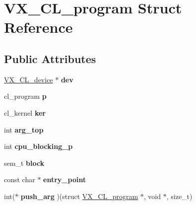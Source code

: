 \hypertarget{structVX__CL__program}{\section{V\-X\-\_\-\-C\-L\-\_\-program Struct Reference}
\label{structVX__CL__program}
}
\subsection*{Public Attributes}
\begin{DoxyCompactItemize}
\item 
\hypertarget{structVX__CL__program_aba4a5c73281e2969f0a7b1c2f6b8abfd}{\hyperlink{structVX__CL__device}{V\-X\-\_\-\-C\-L\-\_\-device} $\ast$ {\bfseries dev}}\label{structVX__CL__program_aba4a5c73281e2969f0a7b1c2f6b8abfd}

\item 
\hypertarget{structVX__CL__program_af38a41457c59d627e8683bd45feb2e28}{cl\-\_\-program {\bfseries p}}\label{structVX__CL__program_af38a41457c59d627e8683bd45feb2e28}

\item 
\hypertarget{structVX__CL__program_abc72bc4d0b075ccc52b6c076db0f8dbe}{cl\-\_\-kernel {\bfseries ker}}\label{structVX__CL__program_abc72bc4d0b075ccc52b6c076db0f8dbe}

\item 
\hypertarget{structVX__CL__program_a9ee13ce6d07263f718148f33e2ea556e}{int {\bfseries arg\-\_\-top}}\label{structVX__CL__program_a9ee13ce6d07263f718148f33e2ea556e}

\item 
\hypertarget{structVX__CL__program_aa509a6a6d02efddac17298b78d576eaf}{int {\bfseries cpu\-\_\-blocking\-\_\-p}}\label{structVX__CL__program_aa509a6a6d02efddac17298b78d576eaf}

\item 
\hypertarget{structVX__CL__program_a572c7479c16d01842e6d4a57fcfc47fd}{sem\-\_\-t {\bfseries block}}\label{structVX__CL__program_a572c7479c16d01842e6d4a57fcfc47fd}

\item 
\hypertarget{structVX__CL__program_a72bfa0908a58f68b280b92d3157c7f9c}{const char $\ast$ {\bfseries entry\-\_\-point}}\label{structVX__CL__program_a72bfa0908a58f68b280b92d3157c7f9c}

\item 
\hypertarget{structVX__CL__program_a2059650e208a8954d569d9a6f5a1a6e8}{int($\ast$ {\bfseries push\-\_\-arg} )(struct \hyperlink{structVX__CL__program}{V\-X\-\_\-\-C\-L\-\_\-program} $\ast$, void $\ast$, size\-\_\-t)}\label{structVX__CL__program_a2059650e208a8954d569d9a6f5a1a6e8}


\end{DoxyCompactItemize}
